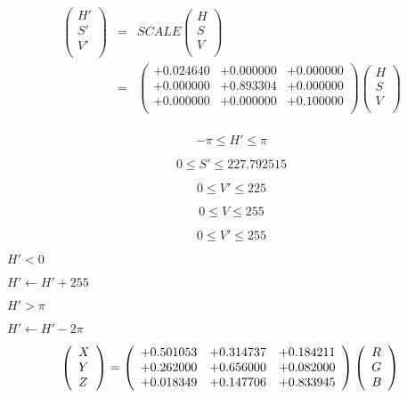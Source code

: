 \documentclass{article}
\begin{document}
\begin{eqnarray*} \left( \begin{array}{l} H' \\ S' \\ V' \\ \end{array} \right) &=& SCALE \left( \begin{array}{l} H \\ S \\ V \\ \end{array} \right) \\ &=& \left( \begin{array}{lll} +0.024640 & +0.000000 & +0.000000 \\ +0.000000 & +0.893304 & +0.000000 \\ +0.000000 & +0.000000 & +0.100000 \\ \end{array} \right) \left( \begin{array}{l} H \\ S \\ V \\ \end{array} \right) \\ \end{eqnarray*}
\pagebreak

\[ -\pi \le H' \le \pi \]
\pagebreak

\[ 0 \le S' \le 227.792515 \]
\pagebreak

\[ 0 \le V' \le 225 \]
\pagebreak

\[ 0 \le V \le 255 \]
\pagebreak

\[ 0 \le V' \le 255 \]
\pagebreak

$H'<0$
\pagebreak

$ H' \gets H' + 255 $
\pagebreak

$H' > \pi$
\pagebreak

$ H' \gets H' - 2\pi $
\pagebreak

\[ \left( \begin{array}{l} X \\ Y \\ Z \\ \end{array} \right) = \left( \begin{array}{lll} +0.501053 & +0.314737 & +0.184211 \\ +0.262000 & +0.656000 & +0.082000 \\ +0.018349 & +0.147706 & +0.833945 \\ \end{array} \right) \left( \begin{array}{l} R \\ G \\ B \\ \end{array} \right) \\ \]
\pagebreak
\end{document}
